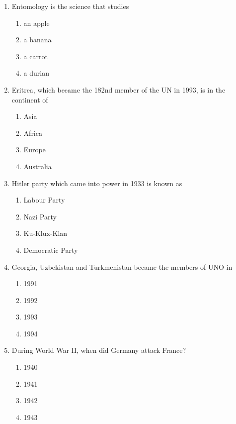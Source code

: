 \documentclass{article}
\begin{document}
{\begin{enumerate}
    \item Entomology is the science that studies
        \begin{enumerate}[label=(\alph*)]
            \item an apple
            \item a banana
            \item a carrot
            \item a durian
        \end{enumerate}
    \item Eritrea, which became the 182nd member of the UN in 1993, is in the continent of
        \begin{enumerate}[label=(\alph*)]
            \item Asia
            \item Africa
            \item Europe
            \item Australia
        \end{enumerate}
    \item Hitler party which came into power in 1933 is known as
        \begin{enumerate}[label=(\alph*)]
            \item Labour Party
            \item Nazi Party
            \item Ku-Klux-Klan
            \item Democratic Party
        \end{enumerate}
    \item Georgia, Uzbekistan and Turkmenistan became the members of UNO in
        \begin{enumerate}[label=(\alph*)]
            \item 1991
            \item 1992
            \item 1993
            \item 1994
        \end{enumerate}
    \item During World War II, when did Germany attack France?
        \begin{enumerate}[label=(\alph*)]
            \item 1940
            \item 1941
            \item 1942
            \item 1943
        \end{enumerate}
\end{enumerate}
\clearpage
}
\end{document}
